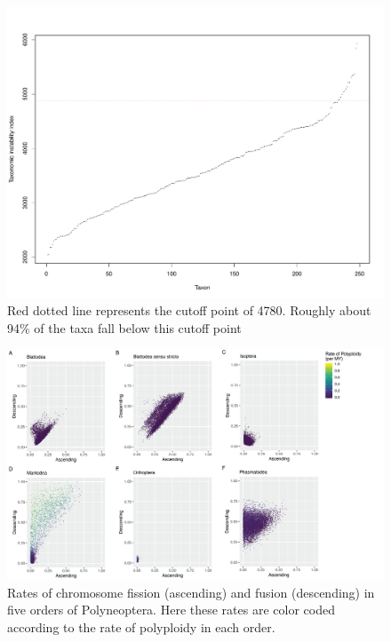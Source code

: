 \begin{figure}
\centering \includegraphics[width=.5\textwidth]{figures/taxonomic_instability_index_plot.pdf}
\caption{
Red dotted line represents the cutoff point of 4780. Roughly about 94\% of the taxa fall below this cutoff point
}
\label{fig:tax.index}
\end{figure}

\begin{figure}
\centering \includegraphics[width=1\textwidth]{figures/rate_estimates.jpg}
\caption{
Rates of chromosome fission (ascending) and fusion (descending) in five orders of Polyneoptera. Here these rates are color coded according to the rate of polyploidy in each order. 
}
\label{fig:rates}
\end{figure}

